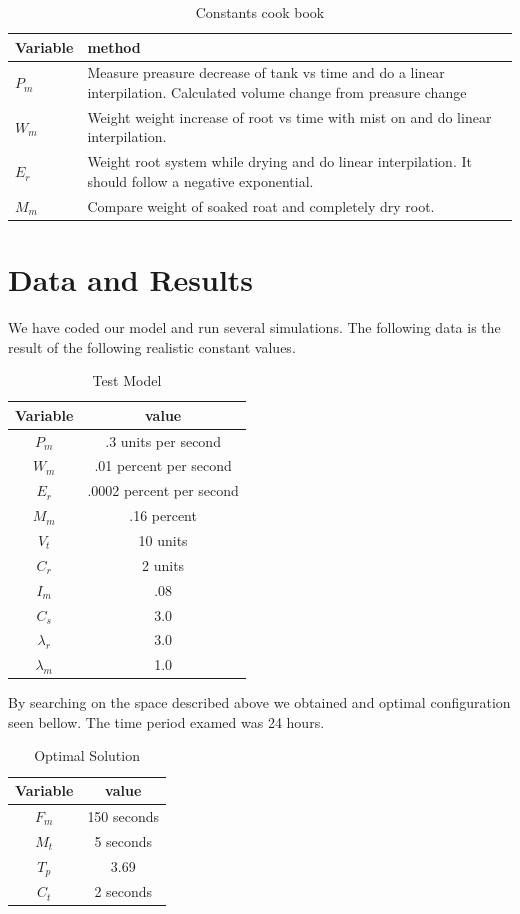 \documentclass[a4paper,12pt]{article}
\begin{document}
\begin{table}[ht]
\caption{Constants cook book}
\centering
\begin{tabular} {p{1 cm} p{9cm}}
\hline\hline
 Variable & method \\ [0.5ex]
\hline
$P_m$ & Measure preasure decrease of tank vs time and do a linear interpilation. Calculated volume change from preasure change \\
$W_m$ & Weight weight increase of root vs time with mist on and do linear interpilation. \\
$E_r$ & Weight root system while drying and do linear interpilation. It should follow a negative exponential. \\ 
$M_m$ & Compare weight of soaked roat and completely dry root. \\ 
\hline
\end{tabular}
\end{table}


\section{Data and Results}

We have coded our model and run several simulations. The following data is the result of the following realistic constant values.


\begin{table}[ht]
\caption{Test Model}
\centering
\begin{tabular} {c c}
\hline\hline
 Variable & value \\ [0.5ex]
\hline
$P_m$ & .3 units per second\\
$W_m$ & .01 percent per second \\
$E_r$ & .0002 percent per second\\ 
$M_m$ & .16 percent \\ 
$V_t$ & 10 units \\
$C_r$ & 2 units \\
$I_m$ & .08 \\
$C_s$ & 3.0 \\
$\lambda_r$ & 3.0 \\
$\lambda_m$ & 1.0 \\ 
\hline
\end{tabular}
\end{table}

By searching on the space described above we obtained and optimal configuration seen bellow. The time period examed was 24 hours.

\begin{table}[ht]
\caption{Optimal Solution}
\centering
\begin{tabular} {c c}
\hline\hline
 Variable & value \\ [0.5ex]
\hline
$F_m$ & 150 seconds \\
$M_t$ & 5 seconds \\
$T_p$ & 3.69 \\ 
$C_t$ & 2 seconds \\ 
\hline
\end{tabular}
\end{table}
\end{document}
